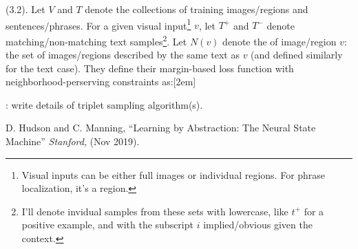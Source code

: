 \documentclass[11pt]{article}
\begin{document}
 (3.2). Let $V$ and $T$ denote the collections of training images/regions and sentences/phrases. For a given visual input\footnote{Visual inputs can be either full images or individual regions. For phrase localization, it's a region.} $v$, let $T^+$ and $T^-$ denote matching/non-matching text samples\footnote{I'll denote invidual samples from these sets with lowercase, like $t^+$ for a positive example, and with the subscript $i$ implied/obvious given the context.}. Let $N(v)$ denote the  of image/region $v$: the set of images/regions described by the same text as $v$ (and defined similarly for the text case). They define their margin-based loss function with neighborhood-perserving constraints as:[2em]

: write details of triplet sampling algorithm(s). 





\vspace{-1em}
{\footnotesize D. Hudson and C. Manning, ``Learning by Abstraction: The Neural State Machine'' \textit{Stanford}, (Nov 2019).}
\end{document}
